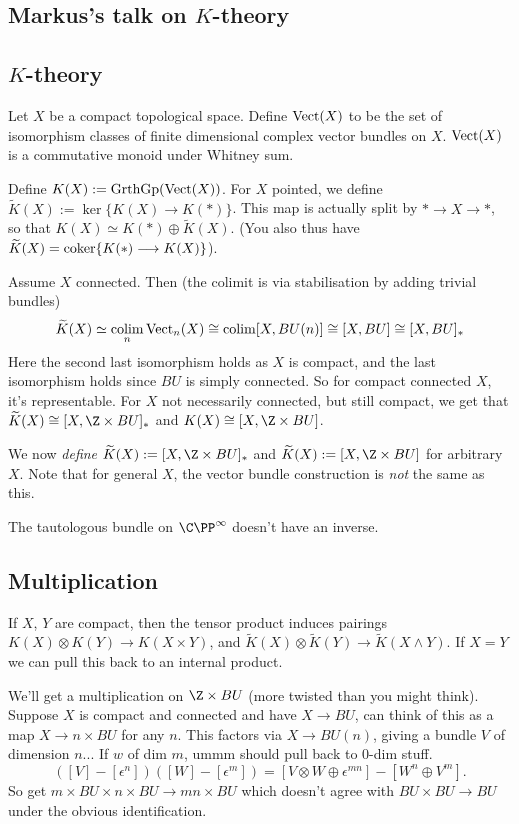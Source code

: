 \documentclass[11pt]{article}
\newcommand{\KanSemResponse}[1]
{
\thispagestyle{fancy}
\section{#1}
}
\begin{document}
\begin{MarkusKtheory}
\KanSemResponse
{Markus's talk on $K$-theory}
\subsection*{$K$-theory}
Let $X$ be a compact topological space. Define $\operatorname{Vect}(X)$ to be the set of isomorphism classes of finite dimensional complex vector bundles on $X$. $\operatorname{Vect}(X)$ is a commutative monoid under Whitney sum.

Define $K(X):=\operatorname{GrthGp}(\operatorname{Vect}(X))$.
For $X$ pointed, we define $\widetilde K(X):=\ker\{K(X)\to K(\ast)\}$. This map is actually split by $\ast\to X\to \ast$, so that $K(X)\simeq K(\ast)\oplus\widetilde K(X)$. (You also thus have $\widetilde K(X)=\operatorname{coker}\{K(\ast)\longrightarrow K(X)\}$).

Assume $X$ connected. Then (the colimit is via stabilisation by adding trivial bundles) 
\[\widetilde K(X)\simeq \operatorname*{colim}_n\operatorname{Vect}_n(X)\cong \operatorname*{colim}[X,BU(n)]\cong[X,BU]\cong[X,BU]_*\]
Here the second last isomorphism holds as $X$ is compact, and the last isomorphism holds since $BU$ is simply connected.
So for compact connected $X$, it's representable. For $X$ not necessarily connected, but still compact, we get that $\widetilde K(X)\cong[X,\Z\times BU]_*$ and $K(X)\cong[X,\Z\times BU]$.

We now \emph{define} $\widetilde K(X):=[X,\Z\times BU]_*$ and $\widetilde K(X):=[X,\Z\times BU]$ for arbitrary $X$. Note that for general $X$, the vector bundle construction is \emph{not} the same as this. 
\begin{exmp*} The tautologous bundle on $\CP^\infty$ doesn't have an inverse.
\end{exmp*} 
\subsection*{Multiplication}
If $X$, $Y$ are compact, then the tensor product induces pairings $K(X)\otimes K(Y)\to K(X\times Y)$, and $\widetilde K(X)\otimes \widetilde K(Y)\to\widetilde K(X\wedge Y)$. If $X=Y$ we can pull this back to an internal product.

We'll get a multiplication on $\Z\times BU$ (more twisted than you might think). Suppose $X$ is compact and connected and have $X\to BU$, can think of this as a map $X\to n\times BU$ for any $n$. This factors via $X\to BU(n)$, giving a bundle $V$ of dimension $n$... If $w$ of dim $m$, ummm should pull back to $0$-dim stuff. 
\[([V]-[\epsilon^n])([W]-[\epsilon^m])=[V\otimes W\oplus\epsilon^{mn}]-[W^n\oplus V^m].\]
So get $m\times BU\times n\times BU\to mn\times BU$ which doesn't agree with $BU\times BU\to BU$ under the obvious identification.


\end{MarkusKtheory}
\end{document}
